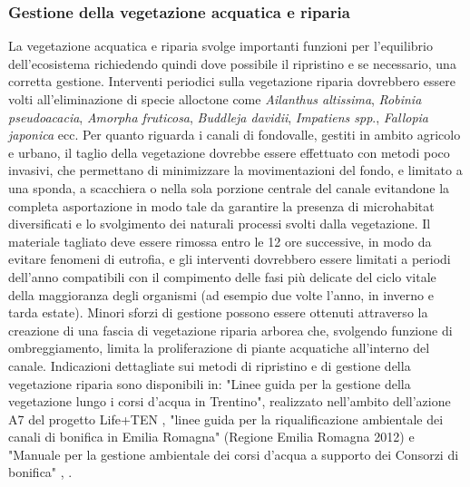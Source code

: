 \documentclass[11pt,a4paper,italian,twoside,openany]{memoir}
\begin{document}
\subsubsection{Gestione della vegetazione acquatica e riparia}
La vegetazione acquatica e riparia svolge importanti funzioni per l'equilibrio dell'ecosistema richiedendo quindi dove possibile il ripristino e se necessario, una corretta gestione. Interventi periodici sulla vegetazione riparia dovrebbero essere volti all'eliminazione di specie alloctone come \emph{Ailanthus altissima}, \emph{Robinia pseudoacacia}, \emph{Amorpha fruticosa}, \emph{Buddleja davidii}, \emph{Impatiens spp}., \emph{Fallopia japonica} ecc. Per quanto riguarda i canali di fondovalle, gestiti in ambito agricolo e urbano, il taglio della vegetazione dovrebbe essere effettuato con metodi poco invasivi, che permettano di minimizzare la movimentazioni del fondo, e limitato a una sponda, a scacchiera o nella sola porzione centrale del canale evitandone la completa asportazione in modo tale da garantire la presenza di microhabitat diversificati e lo svolgimento dei naturali processi svolti dalla vegetazione. Il materiale tagliato deve essere rimossa entro le 12 ore successive, in modo da evitare fenomeni di eutrofia, e gli interventi dovrebbero essere limitati a periodi dell'anno compatibili con il compimento delle fasi più delicate del ciclo vitale della maggioranza degli organismi (ad esempio due volte l'anno, in inverno e tarda estate). Minori sforzi di gestione possono essere ottenuti attraverso la creazione di una fascia di vegetazione riparia arborea che, svolgendo funzione di ombreggiamento, limita la proliferazione di piante acquatiche all'interno del canale. Indicazioni dettagliate sui metodi di ripristino e di gestione della vegetazione riparia sono disponibili in: "Linee guida per la gestione della vegetazione lungo i corsi d'acqua in Trentino", realizzato nell'ambito dell'azione A7 del progetto Life+TEN \cite{Trentini 2014}, "linee guida per la riqualificazione ambientale dei canali di bonifica in Emilia Romagna" (Regione Emilia Romagna 2012) e "Manuale per la gestione ambientale dei corsi d'acqua a supporto dei Consorzi di bonifica" \cite{Veneto Agricoltura 2011}, \cite{Regione Emilia Romagna 2012}.
\end{document}
